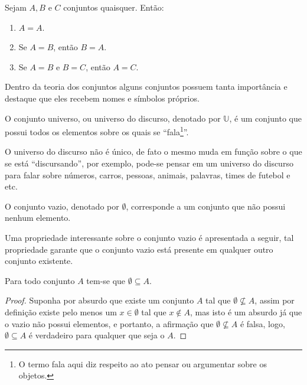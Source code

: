 \begin{theorem}
	\cite{abe1991-TC} Sejam $A, B$ e $C$ conjuntos quaisquer. Então:
	\begin{enumerate}
		\item $A = A$.
		\item Se $A = B$, então $B = A$.
		\item Se $A = B$ e $B = C$, então $A = C$.
	\end{enumerate}
\end{theorem}

Dentro da teoria dos conjuntos alguns conjuntos possuem tanta importância e destaque que eles recebem nomes e símbolos próprios. 

\begin{definition}\label{def:ConjuntoUniverso}
	O conjunto universo, ou universo do discurso, denotado por $\mathbb{U}$, é um conjunto que possui todos os elementos sobre os quais se ``fala\footnote{O termo fala aqui diz respeito ao ato pensar ou argumentar sobre os objetos.}''.
\end{definition}

O universo do discurso não é único, de fato o mesmo muda em função sobre o que se está ``discursando'', por exemplo, pode-se pensar em um universo do discurso para falar sobre números, carros, pessoas, animais, palavras, times de futebol e etc.

\begin{definition}\label{def:ConjuntoVazio}
	O conjunto vazio, denotado por $\emptyset$, corresponde a um conjunto que não possui nenhum elemento.
\end{definition} 

Uma propriedade interessante sobre o conjunto vazio é apresentada a seguir, tal propriedade garante que o conjunto vazio está presente em qualquer outro conjunto existente.

\begin{theorem}\label{teo:ConjuntoVazioSubDeTodos}
	Para todo conjunto $A$ tem-se que $\emptyset \subseteq A$.
\end{theorem}

\begin{proof}
	Suponha por absurdo que existe um conjunto $A$ tal que $\emptyset \not\subseteq A$, assim por definição  existe pelo menos um $x \in \emptyset$ tal que $x \notin A$, mas isto é um absurdo já que o vazio não possui elementos, e portanto, a afirmação que $\emptyset \not\subseteq A$ é falsa, logo, $\emptyset \subseteq A$ é verdadeiro para qualquer que seja o $A$.
\end{proof}

